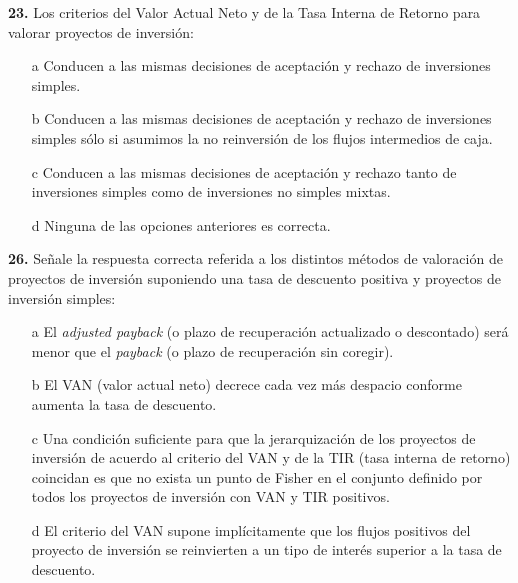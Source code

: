 \documentclass{nuevotema}
\begin{document}
\graficas

\conceptos

\preguntas



\textbf{23.} Los criterios del Valor Actual Neto y de la Tasa Interna de Retorno para valorar proyectos de inversión:

\begin{itemize}
	\item[a] Conducen a las mismas decisiones de aceptación y rechazo de inversiones simples.
	\item[b] Conducen a las mismas decisiones de aceptación y rechazo de inversiones simples sólo si asumimos la no reinversión de los flujos intermedios de caja.
	\item[c] Conducen a las mismas decisiones de aceptación y rechazo tanto de inversiones simples como de inversiones no simples mixtas.
	\item[d] Ninguna de las opciones anteriores es correcta.
\end{itemize}


\textbf{26.} Señale la respuesta correcta referida a los distintos métodos de valoración de proyectos de inversión suponiendo una tasa de descuento positiva y proyectos de inversión simples:

\begin{enumerate}
    \item[a] El \textit{adjusted payback} (o plazo de recuperación actualizado o descontado) será menor que el \textit{payback} (o plazo de recuperación sin coregir).
    \item[b] El VAN (valor actual neto) decrece cada vez más despacio conforme aumenta la tasa de descuento.
    \item[c] Una condición suficiente para que la jerarquización de los proyectos de inversión de acuerdo al criterio del VAN y de la TIR (tasa interna de retorno) coincidan es que no exista un punto de Fisher en el conjunto definido por todos los proyectos de inversión con VAN y TIR positivos.
    \item[d] El criterio del VAN supone implícitamente que los flujos positivos del proyecto de inversión se reinvierten a un tipo de interés superior a la tasa de descuento.
\end{enumerate}
\end{document}
